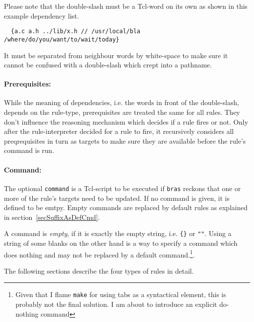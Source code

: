 \documentclass[12pt]{article}
\newcommand{\bras}{\texttt{bras}}
\newcommand{\make}{\texttt{make}}
\begin{document}
Please note that the double-slash must be a Tcl-word on its own as
shown in this example dependency list.
\begin{verbatim}
  {a.c a.h ../lib/x.h // /usr/local/bla /where/do/you/want/to/wait/today}
\end{verbatim}
It must be separated from neighbour words by white-space to make sure
it cannot be confused with a double-slash which crept into a pathname.


\paragraph{Prerequisites:}
While the meaning of dependencies, i.e. the words in front of the
double-slash, depends on the rule-type, prerequisites are treated the
same for all rules. They don't influence the reasoning mechanism which
decides if a rule fires or not. Only after the rule-interpreter
decided for a rule to fire, it recursively considers all
preqrequisites in turn as targets to make sure they are available
before the rule's command is run.

\paragraph{Command:}
The optional \texttt{command} is a Tcl-script to be executed if
\bras{} reckons that one or more of the rule's targets need to be
updated. If no command is given, it is defined to be emtpy. Empty
commands are replaced by default rules as explained in
section~\ref{secSuffixAsDefCmd}. 

A command is \textit{empty}, if it is exactly the empty string,
i.e. \verb+{}+ or \verb+""+. Using a string of some blanks on the
other hand is a way to specify a command which does nothing and may
not be replaced by a default command.\footnote{Given that I flame
\make{} for using tabs as a syntactical element, this is probably not
the final solution. I am about to introduce an explicit do-nothing
command}.

The following sections describe the four types of rules in detail.

\end{document}
